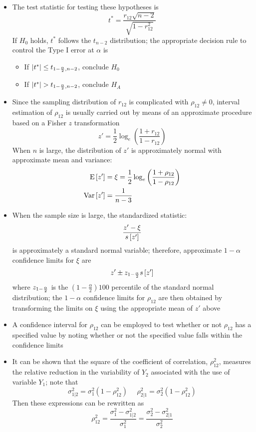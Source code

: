 \begin{itemize}
\item The test statistic for testing these hypotheses is $$ t^* = \frac{r_{12} \sqrt{n-2}}{\sqrt{1-r_{12}^2}} $$ If $H_0$ holds, $t^*$ follows the $t_{n-2}$ distribution; the appropriate decision rule to control the Type I error at $\alpha$ is \begin{itemize} 
\item If $|t^*| \leq t_{1 - \frac{\alpha}{2}, n-2}$, conclude $H_0$ 
\item If $|t^*| > t_{1 - \frac{\alpha}{2}, n-2}$, conclude $H_A$ \end{itemize} 
\item Since the sampling distribution of $r_{12}$ is complicated with $\rho_{12} \neq 0$, interval estimation of $\rho_{12}$ is usually carried out by means of an approximate procedure based on a Fisher $z$ transformation 
$$ z' = \frac{1}{2} \log_e \left(\frac{1+r_{12}}{1 - r_{12}} \right) $$ When $n$ is large, the distribution of $z'$ is approximately normal with approximate mean and variance: $$ \begin{aligned} \mathrm{E}\left[ z' \right] &= \xi = \frac{1}{2}\log_e \left( \frac{1 + \rho_{12}}{1 - \rho_{12}} \right) \\ \mathrm{Var}\left[ z' \right] &= \frac{1}{n-3} \end{aligned} $$ 
\item When the sample size is large, the standardized statistic: $$ \frac{z' - \xi}{s \left[ z' \right]} $$ is approximately a standard normal variable; therefore, approximate $1-\alpha$ confidence limits for $\xi$ are $$ z' \pm z_{1 - \frac{\alpha}{2}} s \left[ z' \right] $$ where $z_{1-\frac{\alpha}{2}}$ is the $(1-\frac{\alpha}{2})100$ percentile of the standard normal distribution; the $1-\alpha$ confidence limits for $\rho_{12}$ are then obtained by transforming the limits on $\xi$ using the appropriate mean of $z'$ above 
\item A confidence interval for $\rho_{12}$ can be employed to test whether or not $\rho_{12}$ has a specified value by noting whether or not the specified value falls within the confidence limits 
\item It can be shown that the square of the coefficient of correlation, $\rho^2_{12}$, measures the relative reduction in the variability of $Y_2$ associated with the use of variable $Y_1$; note that $$ \sigma^2_{1|2} = \sigma_1^2(1-\rho^2_{12}) ~~~~~~ \rho^2_{2|1} = \sigma^2_2(1-\rho^2_{12}) $$ Then these expressions can be rewritten as $$ \rho_{12}^2 = \frac{\sigma_1^2 - \sigma_{1|2}^2}{\sigma_1^2} = \frac{\sigma_2^2 - \sigma^2_{2|1}}{\sigma^2_2} $$ 

\end{itemize}

